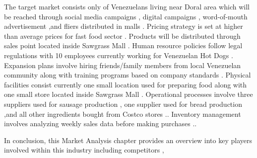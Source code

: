 The target market consists only of Venezuelans living near Doral area which will be reached through social media campaigns , digital campaigns , word-of-mouth advertisement ,and fliers distributed in malls . Pricing strategy is set at higher than average prices for fast food sector . Products will be distributed through sales point located inside Sawgrass Mall . Human resource policies follow legal regulations with 10 employees currently working for Venezuelan Hot Dogs . Expansion plans involve hiring friends/family members from local Venezuelan community along with training programs based on company standards . Physical facilities consist currently one small location used for preparing food along with one small store located inside Sawgrass Mall . Operational processes involve three suppliers used for sausage production , one supplier used for bread production ,and all other ingredients bought from Costco stores .. Inventory management involves analyzing weekly sales data before making purchases .. 

 In conclusion, this Market Analysis chapter provides an overview into key players involved within this industry including competitors ,